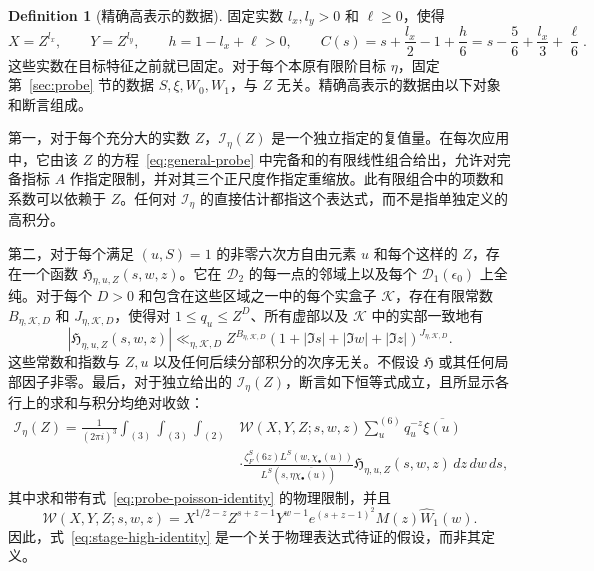 \documentclass[11pt,a4paper]{article}
\numberwithin{equation}{section}
\numberwithin{figure}{section}
\theoremstyle{definition}
\newtheorem{definition}[theorem]{Definition}
\theoremstyle{remark}
\begin{document}
\begin{definition}[精确高表示的数据]
\label{def:stage-high-data}
固定实数 $l_x,l_y>0$ 和 $\ell\ge0$，使得
\begin{equation}
 X=Z^{l_x},\qquad Y=Z^{l_y},\qquad h=1-l_x+\ell>0,
 \qquad
 C(s)=s+\frac{l_x}{2}-1+\frac h6
     =s-\frac56+\frac{l_x}{3}+\frac\ell6.
 \label{eq:stage-mellin-exponent}
\end{equation}
这些实数在目标特征之前就已固定。对于每个本原有限阶目标 $\eta$，固定第~\ref{sec:probe} 节的数据 $S,\xi,W_0,W_1$，与 $Z$ 无关。精确高表示的数据由以下对象和断言组成。

第一，对于每个充分大的实数 $Z$，$\mathscr I_\eta(Z)$ 是一个独立指定的复值量。在每次应用中，它由该 $Z$ 的方程~\eqref{eq:general-probe} 中完备和的有限线性组合给出，允许对完备指标 $A$ 作指定限制，并对其三个正尺度作指定重缩放。此有限组合中的项数和系数可以依赖于 $Z$。任何对 $\mathscr I_\eta$ 的直接估计都指这个表达式，而不是指单独定义的高积分。

第二，对于每个满足 $(u,S)=1$ 的非零六次方自由元素 $u$ 和每个这样的 $Z$，存在一个函数 $\mathfrak H_{\eta,u,Z}(s,w,z)$。它在 $\mathcal D_2$ 的每一点的邻域上以及每个 $\mathcal D_1(\epsilon_0)$ 上全纯。对于每个 $D>0$ 和包含在这些区域之一中的每个实盒子 $\mathcal K$，存在有限常数 $B_{\eta,\mathcal K,D}$ 和 $J_{\eta,\mathcal K,D}$，使得对 $1\le q_u\le Z^D$、所有虚部以及 $\mathcal K$ 中的实部一致地有
\begin{equation}
 |\mathfrak H_{\eta,u,Z}(s,w,z)|
 \ll_{\eta,\mathcal K,D}
 Z^{B_{\eta,\mathcal K,D}}
 (1+|\Im s|+|\Im w|+|\Im z|)^{J_{\eta,\mathcal K,D}}.
 \label{eq:stage-all-height-majorant}
\end{equation}
这些常数和指数与 $Z,u$ 以及任何后续分部积分的次序无关。不假设 $\mathfrak H$ 或其任何局部因子非零。最后，对于独立给出的 $\mathscr I_\eta(Z)$，断言如下恒等式成立，且所显示各行上的求和与积分均绝对收敛：
\begin{equation}
\begin{split}
 \mathscr I_\eta(Z)=\frac1{(2\pi i)^3}
 \int_{(3)}\int_{(3)}\int_{(2)}
 &\mathcal W(X,Y,Z;s,w,z)
 \sum_u^{(6)}q_u^{-z}\overline{\xi(u)}\\
 &\cdot
 \frac{\zeta_F^S(6z)L^S(w,\chi_\bullet(u))}
      {L^S(s,\eta\overline{\chi_\bullet(u)})}
 \mathfrak H_{\eta,u,Z}(s,w,z)\,dz\,dw\,ds,
\end{split}
\label{eq:stage-high-identity}
\end{equation}
其中求和带有式~\eqref{eq:probe-poisson-identity} 的物理限制，并且
\[
 \mathcal W(X,Y,Z;s,w,z)
 =X^{1/2-z}Z^{s+z-1}Y^{w-1}
       e^{(s+z-1)^2}M(z)\widehat W_1(w).
\]
因此，式~\eqref{eq:stage-high-identity} 是一个关于物理表达式待证的假设，而非其定义。
\end{definition}
\end{document}
